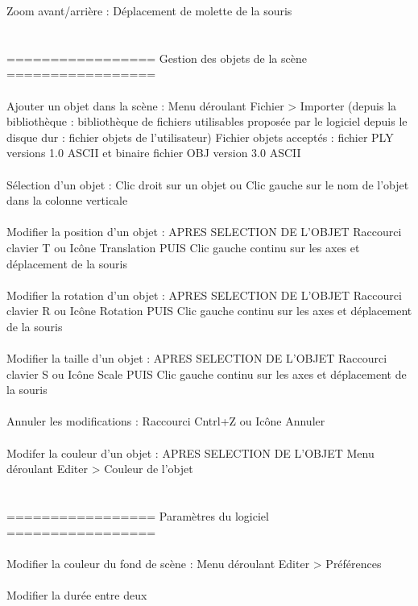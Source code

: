 Zoom avant/arrière :  	    		Déplacement de molette de la souris
\\ \\ \\
================= Gestion des objets de la scène =================
\\ \\
Ajouter un objet dans la scène : 	Menu déroulant Fichier > Importer
	   	      	       		     (depuis la bibliothèque : bibliothèque de fichiers utilisables proposée par le logiciel
					      depuis le disque dur   : fichier objets de l'utilisateur)
		Fichier objets acceptés : fichier PLY versions 1.0 ASCII et binaire
			       		  fichier OBJ version  3.0 ASCII
\\ \\
Sélection d'un objet :			Clic droit sur un objet
	       	     			ou     Clic gauche sur le nom de l'objet dans la colonne verticale
\\ \\
Modifier la position d'un objet :	APRES SELECTION DE L'OBJET
	    	     	  		Raccourci clavier T
					ou     Icône Translation
					PUIS Clic gauche continu sur les axes et déplacement de la souris
\\ \\
Modifier la rotation d'un objet :	APRES SELECTION DE L'OBJET
	    	     	  		Raccourci clavier R
					ou     Icône Rotation
					PUIS Clic gauche continu sur les axes et déplacement de la souris
\\ \\
Modifier la taille d'un objet :		APRES SELECTION DE L'OBJET
	    	     	  		Raccourci clavier S
					ou     Icône Scale
					PUIS Clic gauche continu sur les axes et déplacement de la souris
\\ \\
Annuler les modifications :		Raccourci Cntrl+Z
	    		  		ou     Icône Annuler
\\ \\
Modifer la couleur d'un objet :		APRES SELECTION DE L'OBJET
	   	   	      		Menu déroulant Editer > Couleur de l'objet
\\ \\ \\
================= Paramètres du logiciel =================
\\ \\
Modifier la couleur du fond de scène :	Menu déroulant Editer > Préférences
\\ \\
Modifier la durée entre deux 
